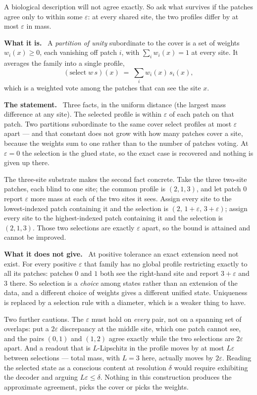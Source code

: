 \documentclass[11pt]{article}
\newcommand{\what}{\par\smallskip\noindent\textbf{What it is.}\ }
\newcommand{\statement}{\par\smallskip\noindent\textbf{The statement.}\ }
\newcommand{\scope}{\par\smallskip\noindent\textbf{What it does not give.}\ }
\begin{document}
A biological description will not agree exactly. So ask what survives if the
patches agree only to within some $\varepsilon$: at every shared site, the two
profiles differ by at most $\varepsilon$ in mass.

\what
A \emph{partition of unity} subordinate to the cover is a set of weights
$w_i(x)\geq0$, each vanishing off patch $i$, with $\sum_i w_i(x)=1$ at every
site. It averages the family into a single profile,
\[
(\mathrm{select}\;w\,s)(x)\;=\;\sum_i w_i(x)\,s_i(x),
\]
which is a weighted vote among the patches that can see the site $x$.

\statement
Three facts, in the uniform distance (the largest mass difference at any site).
The selected profile is within $\varepsilon$ of each patch on that patch. Two
partitions subordinate to the same cover select profiles at most $\varepsilon$
apart --- and that constant does not grow with how many patches cover a site,
because the weights sum to one rather than to the number of patches voting. At
$\varepsilon=0$ the selection is the glued state, so the exact case is
recovered and nothing is given up there.

The three-site substrate makes the second fact concrete. Take the three
two-site patches, each blind to one site; the common profile is $(2,1,3)$, and
let patch $0$ report $\varepsilon$ more mass at each of the two sites it sees.
Assign every site to the lowest-indexed patch containing it and the selection
is $(2,\,1+\varepsilon,\,3+\varepsilon)$; assign every site to the highest-indexed
patch containing it and the selection is $(2,1,3)$. Those two selections are
exactly $\varepsilon$ apart, so the bound is attained and cannot be improved.

\scope
At positive tolerance an exact extension need not exist. For every positive
$\varepsilon$ that family has no global profile restricting exactly to all its patches: patches $0$ and $1$
both see the right-hand site and report $3+\varepsilon$ and $3$ there. So
selection is a \emph{choice} among states rather than an extension of the data,
and a different choice of weights gives a different unified state. Uniqueness
is replaced by a selection rule with a diameter, which is a weaker thing to
have.

Two further cautions. The $\varepsilon$ must hold on \emph{every} pair, not on
a spanning set of overlaps: put a $2\varepsilon$ discrepancy at the middle
site, which one patch cannot see, and the pairs $(0,1)$ and $(1,2)$ agree
exactly while the two selections are $2\varepsilon$ apart. And a readout that
is $L$-Lipschitz in the profile moves by at most $L\varepsilon$ between
selections --- total mass, with $L=3$ here, actually moves by $2\varepsilon$.
Reading the selected state as a conscious content at resolution $\delta$ would
require exhibiting the decoder and arguing $L\varepsilon\leq\delta$. Nothing in
this construction produces the approximate agreement, picks the cover or picks
the weights.
\end{document}
